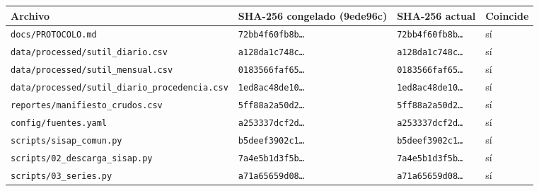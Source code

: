\begin{tabular}{llll}
\toprule
Archivo & SHA-256 congelado (9ede96c) & SHA-256 actual & Coincide \\
\midrule
\texttt{docs/PROTOCOLO.md} & \texttt{72bb4f60fb8b…} & \texttt{72bb4f60fb8b…} & sí \\
\texttt{data/processed/sutil\_diario.csv} & \texttt{a128da1c748c…} & \texttt{a128da1c748c…} & sí \\
\texttt{data/processed/sutil\_mensual.csv} & \texttt{0183566faf65…} & \texttt{0183566faf65…} & sí \\
\texttt{data/processed/sutil\_diario\_procedencia.csv} & \texttt{1ed8ac48de10…} & \texttt{1ed8ac48de10…} & sí \\
\texttt{reportes/manifiesto\_crudos.csv} & \texttt{5ff88a2a50d2…} & \texttt{5ff88a2a50d2…} & sí \\
\texttt{config/fuentes.yaml} & \texttt{a253337dcf2d…} & \texttt{a253337dcf2d…} & sí \\
\texttt{scripts/sisap\_comun.py} & \texttt{b5deef3902c1…} & \texttt{b5deef3902c1…} & sí \\
\texttt{scripts/02\_descarga\_sisap.py} & \texttt{7a4e5b1d3f5b…} & \texttt{7a4e5b1d3f5b…} & sí \\
\texttt{scripts/03\_series.py} & \texttt{a71a65659d08…} & \texttt{a71a65659d08…} & sí \\
\bottomrule
\end{tabular}
